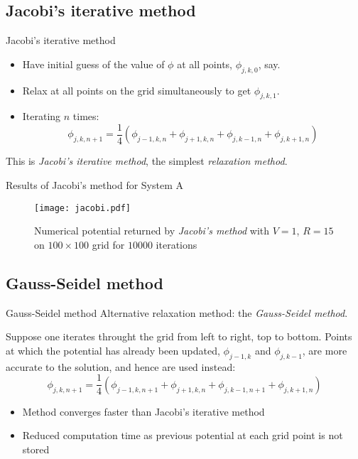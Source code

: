 \documentclass{beamer}
\newcommand{\be}{\begin{equation}}
\newcommand{\ee}{\end{equation}}
\begin{document}
\subsection{Jacobi's iterative method}
\begin{frame}{Jacobi's iterative method}

\begin{itemize}
\item Have initial guess of the value of $\phi$ at all points, $\phi_{j,k,0}$, say.
\item Relax at all points on the grid simultaneously to get $\phi_{j,k,1}$.
\item Iterating $n$ times:
%
\be
\phi_{j,k,n+1}= \frac{1}{4}(\phi_{j-1,k,n}+\phi_{j+1,k,n}+\phi_{j,k-1,n}+\phi_{j,k+1,n})
\ee
%
\end{itemize}

This is \emph{Jacobi's iterative method}, the simplest \emph{relaxation method}.
\end{frame}

\begin{frame}{Results of Jacobi's method for System A}
\begin{figure}
\begin{center}
\texttt{[image: jacobi.pdf]}
\caption{Numerical potential returned by \emph{Jacobi's method} with $V=1$, $R=15$ on
$100\times100$ grid for $10000$ iterations}
\label{fig:jacobi}
\end{center}
\end{figure}

\end{frame}

\subsection{Gauss-Seidel method}
\begin{frame}{Gauss-Seidel method}
Alternative relaxation method: the \emph{Gauss-Seidel method}. 

Suppose one iterates throught the grid from left to right, top to bottom.
Points at which the potential has already been updated, $\phi_{j-1,k}$ and
$\phi_{j,k-1}$, are more accurate to the solution, and hence are used instead:
%
\be
\phi_{j,k,n+1}= \frac{1}{4}(\phi_{j-1,k,n+1}+\phi_{j+1,k,n}+\phi_{j,k-1,n+1}+\phi_{j,k+1,n})
\ee

\begin{itemize}
\item Method converges faster than Jacobi's iterative method
\item Reduced computation time as previous potential at each grid point is not stored
\end{itemize}

\end{frame}
\end{document}
